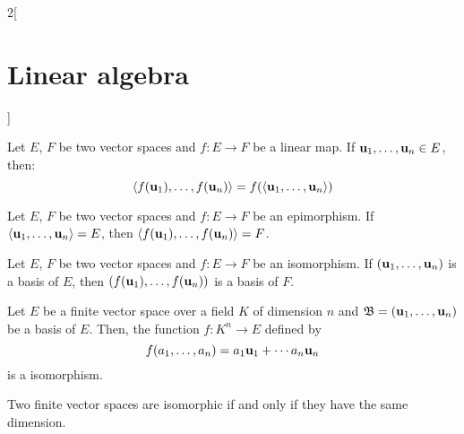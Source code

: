 \documentclass[../../../main.tex]{subfiles}
\begin{document}
\begin{multicols}{2}[\section{Linear algebra}]
\begin{prop}
\end{prop}
\begin{lemma}
    Let $E$, $F$ be two vector spaces and $f:E\rightarrow F$ be a linear map. If $\vb{u}_1,\ldots,\vb{u}_n\in E$, then: $$\langle f(\vb{u}_1),\ldots,f(\vb{u}_n)\rangle=f(\langle\vb{u}_1,\ldots,\vb{u}_n\rangle)$$
\end{lemma}
\begin{corollary}
    Let $E$, $F$ be two vector spaces and $f:E\rightarrow F$ be an epimorphism. If $\langle\vb{u}_1,\ldots,\vb{u}_n\rangle= E$, then $\langle f(\vb{u}_1),\ldots,f(\vb{u}_n)\rangle=F$.
\end{corollary}
\begin{corollary}
    Let $E$, $F$ be two vector spaces and $f:E\rightarrow F$ be an isomorphism. If $(\vb{u}_1,\ldots,\vb{u}_n)$ is a basis of $E$, then $(f(\vb{u}_1),\ldots,f(\vb{u}_n))$ is a basis of $F$. 
\end{corollary}
\begin{theorem}
    Let $E$ be a finite vector space over a field $K$ of dimension $n$ and $\mathfrak{B}=(\vb{u}_1,\ldots,\vb{u}_n)$ be a basis of $E$. Then, the function $f:K^n\rightarrow E$ defined by $$f(a_1,\ldots,a_n)=a_1\vb{u}_1+\cdots a_n\vb{u}_n$$ is a isomorphism.
\end{theorem}
\begin{corollary}
    Two finite vector spaces are isomorphic if and only if they have the same dimension.
\end{corollary}

\end{multicols}
\end{document}
